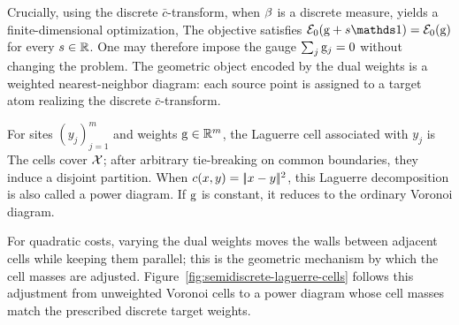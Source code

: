 Crucially, using the discrete $\bar c$-transform, when $\beta$ is a discrete measure, yields a finite-dimensional optimization,
The objective satisfies $\Ee_0(\gD+s\ones)=\Ee_0(\gD)$ for every $s\in\mathbb{R}$. One may therefore impose the gauge $\sum_j\mathrm{g}_j=0$ without changing the problem. The geometric object encoded by the dual weights is a weighted nearest-neighbor diagram: each source point is assigned to a target atom realizing the discrete $\bar c$-transform.

\begin{defn}\label{def-laguerre-power-cells}
	For sites $(y_j)_{j=1}^m$ and weights $\mathrm{g}\in\mathbb{R}^m$, the Laguerre cell associated with $y_j$ is
	The cells cover $\mathcal{X}$; after arbitrary tie-breaking on common boundaries, they induce a disjoint partition. When $c(x,y)=|\!| x-y |\!|^2$, this Laguerre decomposition is also called a power diagram. If $\mathrm{g}$ is constant, it reduces to the ordinary Voronoi diagram.
\end{defn}
For quadratic costs, varying the dual weights moves the walls between adjacent cells while keeping them parallel; this is the geometric mechanism by which the cell masses are adjusted.
%
Figure~\ref{fig:semidiscrete-laguerre-cells} follows this adjustment from unweighted Voronoi cells to a power diagram whose cell masses match the prescribed discrete target weights.


